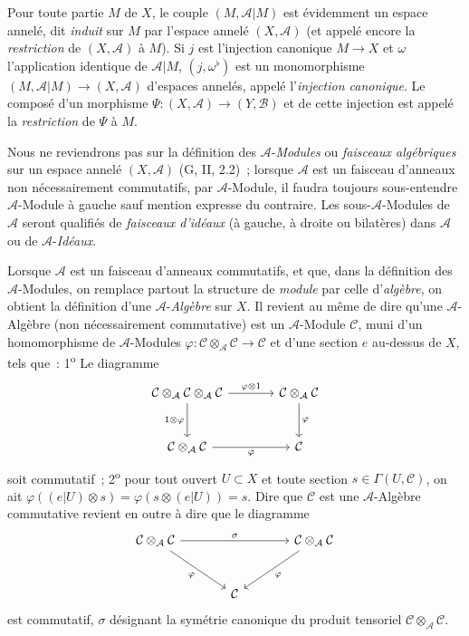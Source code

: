 \begin{env}[4.1.2]
\label{0.4.1.2-fr}
Pour toute partie $M$ de $X$, le couple $(M,\mathcal{A}|M)$ est évidemment un
espace annelé, dit \emph{induit} sur $M$ par l'espace annelé
$(X,\mathcal{A})$ (et appelé encore la \emph{restriction} de
$(X,\mathcal{A})$ à $M$). Si $j$ est l'injection canonique $M\to X$ et
$\omega$ l'application identique de $\mathcal{A}|M$, $(j,\omega^\flat)$ est un
monomorphisme $(M,\mathcal{A}|M)\to(X,\mathcal{A})$ d'espaces annelés, appelé
l'\emph{injection canonique}. Le composé d'un morphisme
$\Psi:(X,\mathcal{A})\to(Y,\mathcal{B})$ et de cette injection est appelé la
\emph{restriction} de $\Psi$ à $M$.
\end{env}

\begin{env}[4.1.3]
\label{0.4.1.3-fr}
Nous ne reviendrons pas sur la définition des $\mathcal{A}$-\emph{Modules} ou
\emph{faisceaux algébriques} sur un espace annelé $(X,\mathcal{A})$
(G, II, 2.2)~; lorsque $\mathcal{A}$ est un faisceau d'anneaux non
nécessairement commutatifs, par $\mathcal{A}$-Module, il faudra toujours
sous-entendre \og $\mathcal{A}$-Module à gauche\fg{} sauf mention expresse du
contraire. Les sous-$\mathcal{A}$-Modules de $\mathcal{A}$ seront qualifiés de
\emph{faisceaux d'idéaux} (à gauche, à droite ou bilatères) dans $\mathcal{A}$ ou de
$\mathcal{A}$-\emph{Idéaux}.

Lorsque $\mathcal{A}$ est un faisceau d'anneaux commutatifs, et que, dans la
définition des $\mathcal{A}$-Modules, on remplace partout la structure de
\emph{module} par celle d'\emph{algèbre}, on obtient la définition d'une
$\mathcal{A}$-\emph{Algèbre} sur $X$. Il revient au même de dire qu'une
$\mathcal{A}$-Algèbre (non nécessairement commutative) est un
$\mathcal{A}$-Module $\mathcal{C}$, muni d'un homomorphisme de
$\mathcal{A}$-Modules
$\varphi:\mathcal{C}\otimes_{\mathcal{A}}\mathcal{C}\to\mathcal{C}$ et
d'une section $e$ au-dessus de $X$, tels que~: 1\textsuperscript{o} Le diagramme
\[
\begin{tikzcd}[column sep=large,row sep=large]
\mathcal{C}\otimes_{\mathcal{A}}\mathcal{C}\otimes_{\mathcal{A}}\mathcal{C}
  \arrow[r,"\varphi\otimes 1"]
  \arrow[d,"1\otimes\varphi"']
&
\mathcal{C}\otimes_{\mathcal{A}}\mathcal{C}
  \arrow[d,"\varphi"]
\\
\mathcal{C}\otimes_{\mathcal{A}}\mathcal{C}
  \arrow[r,"\varphi"']
&
\mathcal{C}
\end{tikzcd}
\]
soit commutatif~; 2\textsuperscript{o} pour tout ouvert $U\subset X$ et toute section
$s\in\Gamma(U,\mathcal{C})$, on ait
$\varphi((e|U)\otimes s)=\varphi(s\otimes(e|U))=s$. Dire que
$\mathcal{C}$ est une $\mathcal{A}$-Algèbre commutative revient en outre à
dire que le diagramme
\[
\begin{tikzcd}[column sep=large,row sep=large]
\mathcal{C}\otimes_{\mathcal{A}}\mathcal{C}
  \arrow[rr,"\sigma"]
  \arrow[dr,"\varphi"']
&&
\mathcal{C}\otimes_{\mathcal{A}}\mathcal{C}
  \arrow[dl,"\varphi"]
\\
& \mathcal{C} &
\end{tikzcd}
\]
est commutatif, $\sigma$ désignant la symétrie canonique du produit tensoriel
$\mathcal{C}\otimes_{\mathcal{A}}\mathcal{C}$.


\end{env}
